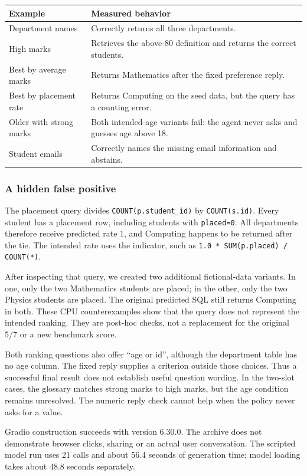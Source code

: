 \documentclass[11pt,a4paper]{article}
\newcommand{\file}[1]{\nolinkurl{#1}}
\begin{document}
\begin{tabularx}{\linewidth}{@{}lY@{}}
\toprule
Example & Measured behavior \\
\midrule
Department names & Correctly returns all three departments. \\
High marks & Retrieves the above-80 definition and returns the correct students. \\
Best by average marks & Returns Mathematics after the fixed preference reply. \\
Best by placement rate & Returns Computing on the seed data, but the query has a counting error. \\
Older with strong marks & Both intended-age variants fail: the agent never asks and guesses age above 18. \\
Student emails & Correctly names the missing email information and abstains. \\
\bottomrule
\end{tabularx}

\subsubsection{A hidden false positive}
The placement query divides \file{COUNT(p.student_id)} by \file{COUNT(s.id)}. Every student has a
placement row, including students with \file{placed=0}. All departments therefore receive predicted
rate 1, and Computing happens to be returned after the tie. The intended rate uses the indicator, such
as \texttt{1.0 * SUM(p.placed) / COUNT(*)}.

After inspecting that query, we created two additional fictional-data variants. In one, only the two
Mathematics students are placed; in the other, only the two Physics students are placed. The original
predicted SQL still returns Computing in both. These CPU counterexamples show that the query does not
represent the intended ranking. They are post-hoc checks, not a replacement for the original 5/7 or a
new benchmark score.

Both ranking questions also offer ``age or id'', although the department table has no age column.
The fixed reply supplies a criterion outside those choices. Thus a successful final result does not
establish useful question wording. In the two-slot cases, the glossary matches strong marks to high
marks, but the age condition remains unresolved. The numeric reply check cannot help when the policy
never asks for a value.

Gradio construction succeeds with version 6.30.0. The archive does not demonstrate browser clicks,
sharing or an actual user conversation. The scripted model run uses 21 calls and about 56.4 seconds
of generation time; model loading takes about 48.8 seconds separately.
\end{document}
